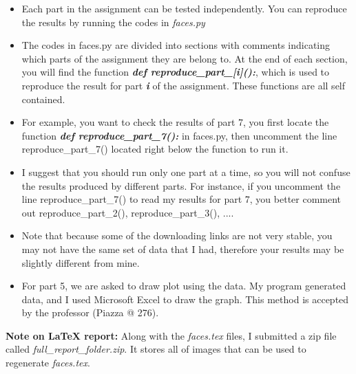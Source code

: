\documentclass{article}
\begin{document}
\begin{itemize}
	\item Each part in the assignment can be tested independently. You can reproduce the results by running the codes in \textit{faces.py}
	\item The codes in faces.py are divided into sections with comments indicating which parts of the assignment they are belong to. At the end of each section, you will find the function \textbf{\textit{def reproduce\_part\_[i]():}}, which is used to reproduce the result for part \textbf{\textit{i}} of the assignment. These functions are all self contained.
	\item For example, you want to check the results of part 7, you first locate the function \textbf{\textit{def reproduce\_part\_7():}} in faces.py, then uncomment the line reproduce\_part\_7() located right below the function to run it.
	\item I suggest that you should run only one part at a time, so you will not confuse the results produced by different parts. For instance, if you uncomment the line reproduce\_part\_7() to read my results for part 7, you better comment out reproduce\_part\_2(), reproduce\_part\_3(), ....
	\item Note that because some of the downloading links are not very stable, you may not have the same set of data that I had, therefore your results may be slightly different from mine.
	\item For part 5, we are asked to draw plot using the data. My program generated data, and I used Microsoft Excel to draw the graph. This method is accepted by the professor (Piazza @ 276).
\end{itemize}
\textbf{Note on LaTeX report:} Along with the \textit{faces.tex} files, I submitted a zip file called  \textit{full\_report\_folder.zip}. It stores all of images that can be used to regenerate \textit{faces.tex}.
\clearpage

\end{document}
